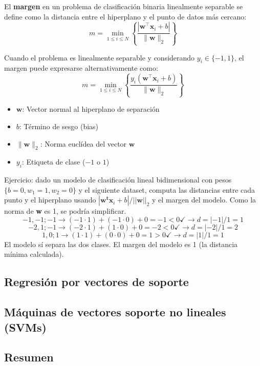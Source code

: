 El \textbf{margen} en un problema de clasificación binaria linealmente separable se define como la distancia entre el hiperplano y el punto de datos más cercano:
$$m = \min_{1 \leq i \leq N} \left\{ \frac{|\mathbf{w}^\intercal \mathbf{x}_i + b|}{\|\mathbf{w}\|_2} \right\}$$

Cuando el problema es linealmente separable y considerando $y_i \in \{-1, 1\}$, el margen puede expresarse alternativamente como:
$$m = \min_{1 \leq i \leq N} \left\{ \frac{y_i(\mathbf{w}^\intercal \mathbf{x}_i + b)}{\|\mathbf{w}\|_2} \right\}$$

\begin{itemize}
    \item $\mathbf{w}$: Vector normal al hiperplano de separación
    \item $b$: Término de sesgo (bias)
    \item $\|\mathbf{w}\|_2$: Norma euclídea del vector $\mathbf{w}$
    \item $y_i$: Etiqueta de clase ($-1$ o $1$)
\end{itemize}

Ejercicio: dado un modelo de clasificación lineal bidimensional con pesos $\{b = 0, w_1 = 1, w_2 = 0\}$ y el siguiente dataset, computa las distancias entre cada punto y el hiperplano usando $|\mathbf{w^tx}_i + b| / ||\mathbf{w}||_2$ y el margen del modelo. Como la norma de \textbf{w} es 1, se podría simplificar.
$$-1, -1; -1 \rightarrow (-1 \cdot 1) + (-1 \cdot 0) + 0 = -1 < 0 \checkmark \rightarrow d = |-1|/1 = 1 $$
$$-2, 1; -1 \rightarrow (-2 \cdot 1) + (1 \cdot 0) + 0 = -2  < 0 \checkmark \rightarrow d = |-2|/1 = 2$$
$$1, 0; 1 \rightarrow (1 \cdot 1) + (0 \cdot 0) + 0 = 1  > 0 \checkmark \rightarrow d = |1|/1 = 1$$
El modelo sí separa las dos clases. El margen del modelo es 1 (la distancia mínima calculada). 

\subsection{Regresión por vectores de soporte}

\subsection{Máquinas de vectores soporte no lineales (SVMs)}

\subsection{Resumen}